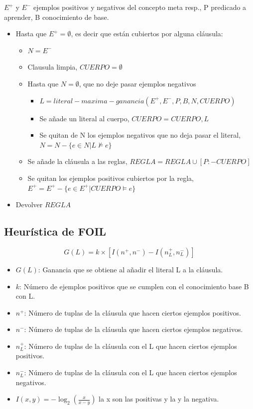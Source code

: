 \documentclass[12pt, twoside, openright]{report} %
\begin{document}
$E^+$ y $E^-$ ejemplos positivos y negativos del concepto meta resp., P predicado a aprender, B conocimiento de base.
\begin{itemize}
  \item Hasta que $E^+ = \emptyset$, es decir que están cubiertos por alguna cláusula:
  \begin{itemize}
    \item $N = E^-$
    \item Clausula limpia, $CUERPO = \emptyset$
    \item Hasta que $N = \emptyset$, que no deje pasar ejemplos negativos
    \begin{itemize}
      \item $L = literal-maxima-ganancia(E^+, E^-, P, B, N, CUERPO)$
      \item Se añade un literal al cuerpo, $CUERPO = CUERPO, L$
      \item Se quitan de N los ejemplos negativos que no deja pasar el literal, $N = N - \{e \in N | L \nvDash e\}$
    \end{itemize}  
    \item Se añade la cláusula a las reglas, $REGLA = REGLA \cup [P:-CUERPO]$
    \item Se quitan los ejemplos positivos cubiertos por la regla, $E^+ = E^+ - \{e \in E^+ | CUERPO \vDash e\}$
  \end{itemize}
  \item Devolver $REGLA$
\end{itemize}
\pagebreak
\subsection{Heurística de FOIL}
$$G(L)=k\times [I(n^+,n^-)-I(n^+_L, n^-_L)]$$
\begin{itemize}
  \item $G(L)$: Ganancia que se obtiene al añadir el literal L a la cláusula.
  \item $k$: Número de ejemplos positivos que se cumplen con el conocimiento base B con L.
  \item $n^+$: Número de tuplas de la cláusula que hacen ciertos ejemplos positivos.
  \item $n^-$: Número de tuplas de la cláusula que hacen ciertos ejemplos negativos.
  \item $n^+_L$: Número de tuplas de la cláusula con el L que hacen ciertos ejemplos positivos.
  \item $n^-_L$: Número de tuplas de la cláusula con el L que hacen ciertos ejemplos negativos.
  \item $I(x, y)=-\log_2 \left( \frac{x}{x-y} \right)$ la x son las positivas y la y la negativa.
\end{itemize}
\end{document}
